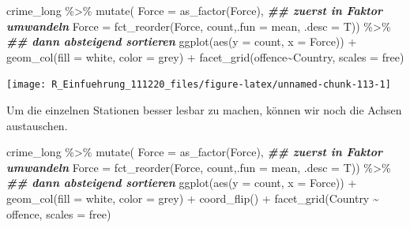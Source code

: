 \documentclass[
]{book}
\newenvironment{Shaded}{\begin{snugshade}}{\end{snugshade}}
\newcommand{\AttributeTok}[1]{\textcolor[rgb]{0.77,0.63,0.00}{#1}}
\newcommand{\DocumentationTok}[1]{\textcolor[rgb]{0.56,0.35,0.01}{\textbf{\textit{#1}}}}
\newcommand{\FunctionTok}[1]{\textcolor[rgb]{0.00,0.00,0.00}{#1}}
\newcommand{\NormalTok}[1]{#1}
\newcommand{\SpecialCharTok}[1]{\textcolor[rgb]{0.00,0.00,0.00}{#1}}
\newcommand{\StringTok}[1]{\textcolor[rgb]{0.31,0.60,0.02}{#1}}
\begin{document}
\begin{Shaded}
\begin{Highlighting}[]
\NormalTok{crime\_long }\SpecialCharTok{\%\textgreater{}\%} 
  \FunctionTok{mutate}\NormalTok{(}
      \AttributeTok{Force =} \FunctionTok{as\_factor}\NormalTok{(Force), }\DocumentationTok{\#\# zuerst in Faktor umwandeln}
      \AttributeTok{Force =} \FunctionTok{fct\_reorder}\NormalTok{(Force, count,}\AttributeTok{.fun =}\NormalTok{ mean, }\AttributeTok{.desc =}\NormalTok{ T)) }\SpecialCharTok{\%\textgreater{}\%} \DocumentationTok{\#\# dann absteigend sortieren}
\FunctionTok{ggplot}\NormalTok{(}\FunctionTok{aes}\NormalTok{(}\AttributeTok{y =}\NormalTok{ count,}
             \AttributeTok{x =}\NormalTok{ Force)) }\SpecialCharTok{+}
  \FunctionTok{geom\_col}\NormalTok{(}\AttributeTok{fill =} \StringTok{\textquotesingle{}white\textquotesingle{}}\NormalTok{,}
           \AttributeTok{color =} \StringTok{\textquotesingle{}grey\textquotesingle{}}\NormalTok{) }\SpecialCharTok{+}
  \FunctionTok{facet\_grid}\NormalTok{(offence}\SpecialCharTok{\textasciitilde{}}\NormalTok{Country, }
             \AttributeTok{scales =} \StringTok{\textquotesingle{}free\textquotesingle{}}\NormalTok{)}
\end{Highlighting}
\end{Shaded}

\begin{center}\texttt{[image: R\_Einfuehrung\_111220\_files/figure-latex/unnamed-chunk-113-1]} \end{center}

Um die einzelnen Stationen besser lesbar zu machen, können wir noch die Achsen austauschen.

\begin{Shaded}
\begin{Highlighting}[]
\NormalTok{crime\_long }\SpecialCharTok{\%\textgreater{}\%} 
  \FunctionTok{mutate}\NormalTok{(}
      \AttributeTok{Force =} \FunctionTok{as\_factor}\NormalTok{(Force), }\DocumentationTok{\#\# zuerst in Faktor umwandeln}
      \AttributeTok{Force =} \FunctionTok{fct\_reorder}\NormalTok{(Force, count,}\AttributeTok{.fun =}\NormalTok{ mean, }\AttributeTok{.desc =}\NormalTok{ T)) }\SpecialCharTok{\%\textgreater{}\%} \DocumentationTok{\#\# dann absteigend sortieren}
\FunctionTok{ggplot}\NormalTok{(}\FunctionTok{aes}\NormalTok{(}\AttributeTok{y =}\NormalTok{ count,}
             \AttributeTok{x =}\NormalTok{ Force)) }\SpecialCharTok{+}
  \FunctionTok{geom\_col}\NormalTok{(}\AttributeTok{fill =} \StringTok{\textquotesingle{}white\textquotesingle{}}\NormalTok{,}
           \AttributeTok{color =} \StringTok{\textquotesingle{}grey\textquotesingle{}}\NormalTok{) }\SpecialCharTok{+}
  \FunctionTok{coord\_flip}\NormalTok{() }\SpecialCharTok{+}
  \FunctionTok{facet\_grid}\NormalTok{(Country }\SpecialCharTok{\textasciitilde{}}\NormalTok{ offence, }
             \AttributeTok{scales =} \StringTok{\textquotesingle{}free\textquotesingle{}}\NormalTok{)}
\end{Highlighting}
\end{Shaded}
\end{document}

